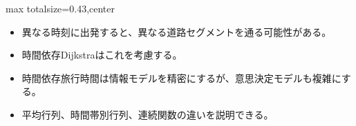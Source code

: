 \clearpage
{}
\begin{minipage}[t]{0.405\textwidth}
\begin{adjustbox}{max totalsize={\textwidth}{0.43\textheight},center}
\begin{minipage}{\textwidth}\scriptsize
{}\begin{itemize}
\item 異なる時刻に出発すると、異なる道路セグメントを通る可能性がある。
\item 時間依存Dijkstraはこれを考慮する。
\end{itemize}\begin{itemize}
\item 時間依存旅行時間は情報モデルを精密にするが、意思決定モデルも複雑にする。
\item 平均行列、時間帯別行列、連続関数の違いを説明できる。
\end{itemize}
\end{minipage}
\end{adjustbox}
\end{minipage}\hfill
